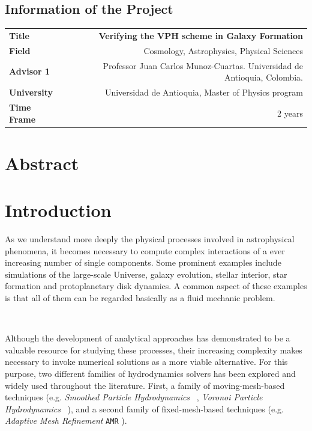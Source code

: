 \documentclass[a4,useAMS,usenatbib,usegraphicx,12pt]{article}
\begin{document}
\subsection*{Information of the Project}
\begin{tabular}{L!{\VRule}R}
\bf Title		& \bf Verifying the VPH scheme in Galaxy Formation\\
\bf Field		& Cosmology, Astrophysics, Physical Sciences \\
\bf Advisor 1	& Professor Juan Carlos Munoz-Cuartas. Universidad de Antioquia, Colombia.\\
\bf University	& Universidad de Antioquia, Master of Physics program \\
\bf Time Frame	& 2 years \\
\end{tabular}
\normalsize

\section{Abstract}
\newpage


\section{Introduction}
As we understand more deeply the physical processes involved in astrophysical 
phenomena, it becomes necessary to compute complex interactions of a ever 
increasing number of single components. Some prominent examples include 
simulations of the large-scale Universe, galaxy evolution, stellar interior, 
star formation and protoplanetary disk dynamics. A common aspect of these 
examples is that all of them can be regarded basically as a fluid mechanic 
problem.

\

Although the development of analytical approaches has demonstrated to be a
valuable resource for studying these processes, their increasing complexity 
makes necessary to invoke numerical solutions as a more viable alternative. For
this purpose, two different families of hydrodynamics solvers has been explored 
and widely used throughout the literature. First, a family of moving-mesh-based 
techniques (e.g. \textit{Smoothed Particle Hydrodynamics} \SPH\ 
\citep{Monaghan92}, \textit{Voronoi Particle Hydrodynamics} \VPH\ 
\citep{Hess10}), and a second family of fixed-mesh-based techniques (e.g.
\textit{Adaptive Mesh Refinement} \texttt{AMR} \citep{Berger89}).
\end{document}

